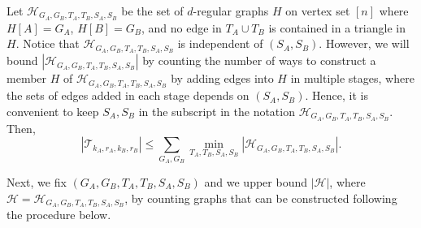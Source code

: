 \documentclass[11pt]{article}
\theoremstyle{plain}
\begin{document}
Let $\mathcal H_{G_A, G_B, T_A, T_B, S_A, S_B}$ be the set of $d$-regular graphs $H$ on vertex set $[n]$ where $H[A] = G_A$, $H[B] = G_B$, and no edge in $T_A \cup T_B$ is contained in a triangle in $H$. Notice that $\mathcal H_{G_A, G_B, T_A, T_B, S_A, S_B}$ is independent of  $(S_A, S_B)$. However, we will bound $|\mathcal H_{G_A, G_B, T_A, T_B, S_A, S_B}|$ by counting the number of ways to construct a member $H$ of $\mathcal H_{G_A, G_B, T_A, T_B, S_A, S_B}$ by adding edges into $H$ in multiple stages, where the sets of edges added in each stage depends on $(S_A,S_B)$. Hence, it is convenient to keep $S_A,S_B$ in the subscript in the notation $\mathcal H_{G_A, G_B, T_A, T_B, S_A, S_B}$.      Then,
\begin{equation}
|\mathcal T_{k_A, r_A, k_B, r_B}|\le \sum_{G_A,G_B} \min_{T_A,T_B,S_A,S_B}|{\mathcal H}_{G_A,G_B,T_A,T_B,S_A,S_B}|.\label{eq:insideGAGB}
\end{equation}

Next, we fix $(G_A,G_B,T_A,T_B,S_A,S_B)$ and we upper bound $|\mathcal H|$, where \newline${\mathcal H}={\mathcal H}_{G_A,G_B,T_A,T_B,S_A,S_B}$,
by counting graphs that can be constructed following the procedure below. 
\end{document}

